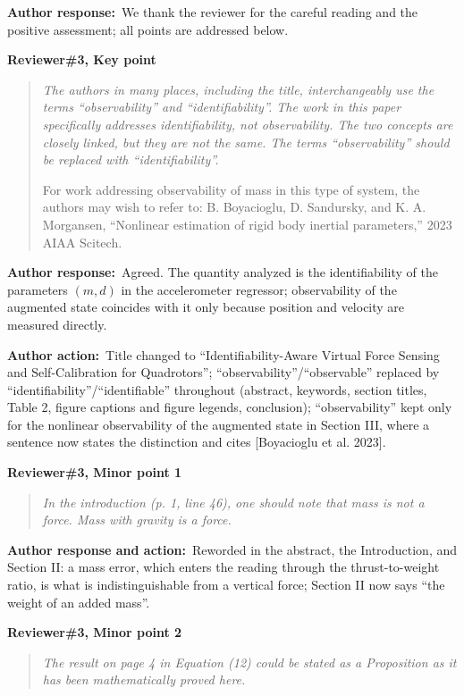 \documentclass[11pt]{article}
\newcommand{\concern}[1]{\par\medskip\noindent\colorbox{gray!12}{\parbox{\dimexpr\linewidth-2\fboxsep}{\textbf{#1}}}\par\smallskip}
\newcommand{\rlabel}[1]{\par\textbf{#1}\ }
\begin{document}
\rlabel{Author response:}We thank the reviewer for the careful reading and the positive assessment; all points are addressed below.

\concern{Reviewer\#3, Key point}

\begin{quote}\itshape The authors in many places, including the title, interchangeably use the terms ``observability'' and ``identifiability''. The work in this paper specifically addresses identifiability, not observability. The two concepts are closely linked, but they are not the same. The terms ``observability'' should be replaced with ``identifiability''.\par For work addressing observability of mass in this type of system, the authors may wish to refer to: B. Boyacioglu, D. Sandursky, and K. A. Morgansen, ``Nonlinear estimation of rigid body inertial parameters,'' 2023 AIAA Scitech.\end{quote}

\rlabel{Author response:}Agreed. The quantity analyzed is the identifiability of the parameters $(m, d)$ in the accelerometer regressor; observability of the augmented state coincides with it only because position and velocity are measured directly.

\rlabel{Author action:}Title changed to ``Identifiability-Aware Virtual Force Sensing and Self-Calibration for Quadrotors''; ``observability''/``observable'' replaced by ``identifiability''/``identifiable'' throughout (abstract, keywords, section titles, Table 2, figure captions and figure legends, conclusion); ``observability'' kept only for the nonlinear observability of the augmented state in Section III, where a sentence now states the distinction and cites [Boyacioglu et al. 2023].

\concern{Reviewer\#3, Minor point 1}

\begin{quote}\itshape In the introduction (p. 1, line 46), one should note that mass is not a force. Mass with gravity is a force.\end{quote}

\rlabel{Author response and action:}Reworded in the abstract, the Introduction, and Section II: a mass error, which enters the reading through the thrust-to-weight ratio, is what is indistinguishable from a vertical force; Section II now says ``the weight of an added mass''.

\concern{Reviewer\#3, Minor point 2}

\begin{quote}\itshape The result on page 4 in Equation (12) could be stated as a Proposition as it has been mathematically proved here.\end{quote}
\end{document}
